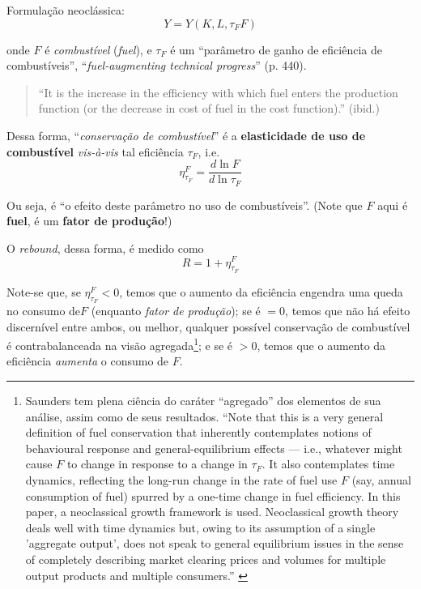 Formulação neoclássica:
$$
Y = Y(K, L, \tau_{F} F)
$$

onde $F$ é \textit{combustível} (\textit{fuel}), e $\tau_{F}$ é um ``parâmetro de ganho de eficiência de combustíveis'', ``\textit{fuel-augmenting technical progress}'' (p. 440).
\begin{quote}
``It is the increase in the efficiency with which fuel enters the production function (or the decrease in cost of fuel in the cost function).'' (ibid.)
\end{quote}

Dessa forma, ``\textit{conservação de combustível}'' é a \textbf{elasticidade de uso de combustível} \textit{vis-à-vis} tal eficiência $\tau_{F}$, i.e.
$$
\eta^F_{\tau_{F}} = \frac{d\ln F}{d\ln \tau_{F}}
$$

Ou seja, é ``o efeito deste parâmetro no uso de combustíveis''. (Note que $F$ aqui é \textbf{fuel}, é um \textbf{fator de produção}!)

O \textit{rebound}, dessa forma, é medido como
$$
R = 1 + \eta^{F}_{\tau_{F}}
$$

Note-se que, se $\eta^{F}_{\tau_{F}}<0$, temos que o aumento da eficiência engendra uma queda no consumo de$F$ (enquanto \textit{fator de produção}); se é $=0$, temos que não há efeito discernível entre ambos, ou melhor, qualquer possível conservação de combustível é contrabalanceada na visão agregada\footnote{Saunders tem plena ciência do caráter ``agregado'' dos elementos de sua análise, assim como de seus resultados. ``Note that this is a very general definition of fuel conservation that inherently contemplates notions of behavioural response and general-equilibrium effects — i.e., whatever might cause $F$ to change in response to a change in $\tau_{F}$. It also contemplates time dynamics, reflecting the long-run change in the rate of fuel use $F$ (say, annual consumption of fuel) spurred by a one-time change in fuel efficiency. In this paper, a neoclassical growth framework is used. Neoclassical growth theory deals well with time dynamics but, owing to its assumption of a single 'aggregate output', does not speak to general equilibrium issues in the sense of completely describing market clearing prices and volumes for multiple output products and multiple consumers.'' \parencite[p. 440, n. 2]{Saunders2000}}; e se é $>0$, temos que o aumento da eficiência \textit{aumenta} o consumo de $F$.

